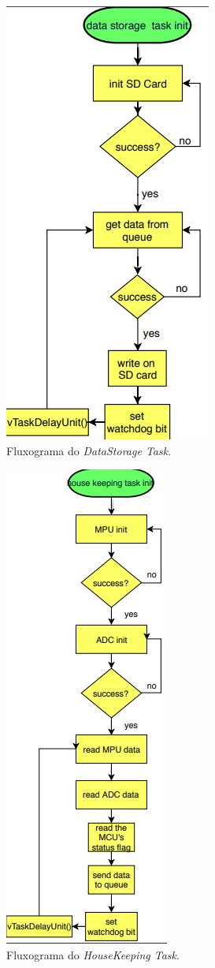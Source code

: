 \begin{apendicesenv}
\begin{figure}[!h]
	\centerfloat
	\centering
	\includegraphics[keepaspectratio=true,scale=0.5]{figuras/flowChart_dataStorage.PNG}
	\caption{Fluxograma do \textit{DataStorage Task}.}
	\label{flowChart_dataStorage}
\end{figure}

\begin{figure}[!h]
	\centerfloat
	\centering
	\includegraphics[keepaspectratio=true,scale=0.45]{figuras/flowChart_houseKeeping.PNG}
	\caption{Fluxograma do \textit{HouseKeeping Task}.}
	\label{flowChart_houseKeeping}
\end{figure}

\end{apendicesenv}